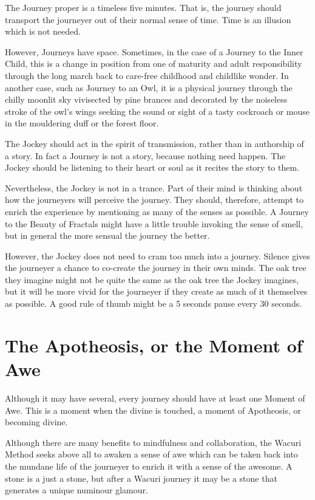 \documentclass[12pt]{book}
\begin{document}
The Journey proper is a timeless five minutes. That is,
the journey should transport the journeyer out of their normal sense
of time. Time is an illusion which is not needed.

However, Journeys have space. Sometimes, in the case of a
Journey to the Inner Child, this is a change in position from
one of maturity and adult responsibility through the long march
back to care-free childhood and childlike wonder.  In another case,
such as Journey to an Owl, it is a physical journey through
the chilly moonlit sky vivisected by pine brances and decorated
by the noiseless stroke of the owl's wings seeking the sound
or sight of a tasty cockroach or mouse in the mouldering duff
or the forest floor.

The Jockey should act in the spirit of transmission,
rather than in authorship of a story. In fact a Journey is
not a story, because nothing need happen. The Jockey should
be listening to their heart or soul as it recites the
story to them.

Nevertheless, the Jockey is not in a trance. Part of their
mind is thinking about how the journeyers will perceive the
journey.  They should, therefore, attempt to enrich the
experience by mentioning as many of the senses as possible.
A Journey to the Beauty of Fractals might have a little
trouble invoking the sense of smell, but in general
the more sensual the journey the better.

However, the Jockey does not need to cram too much
into a journey. Silence gives the journeyer a chance
to co-create the journey in their own minds. The oak tree
they imagine might not be quite the same as the oak tree
the Jockey imagines, but it will be more vivid for the
journeyer if they create as much of it themselves as
possible.  A good rule of thumb might be a 5 seconds
pause every 30 seconds.

\section{ The Apotheosis, or the Moment of Awe}

Although it may have several, every journey should have
at least one Moment of Awe. This is a moment when the
divine is touched, a moment of Apotheosis, or becoming divine.

Although there are many benefits to mindfulness and
collaboration, the Wacuri Method seeks above all to
awaken a sense of awe which can be taken back into the
mundane life of the journeyer to enrich it with a sense
of the awesome. A stone is a just a stone, but after a
Wacuri journey it may be a stone that generates a unique
numinour glamour.
\end{document}
